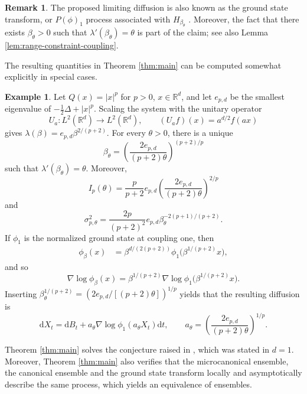 \documentclass[11pt,reqno]{amsart}
\theoremstyle{definition}
\newtheorem{remark}[theorem]{Remark}
\newtheorem{example}[theorem]{Example}
\numberwithin{equation}{section}
\newcommand{\<}{\langle}
\renewcommand{\>}{\rangle}
\def\de{{\rm d}}
\def\de{{\mathrm {d}}}
\def\bbR{{\mathbb{R}}}
\begin{document}
\begin{remark}
    The proposed limiting diffusion is  also known as the ground state transform, or $P(\phi)_1$ process associated with $H_{\beta_\theta}$ \cite{Simon79,LHB20}. Moreover, the fact that there exists $\beta_\theta >0$ such that $\lambda' (\beta_\theta) = \theta$ is part of the claim; see also Lemma \ref{lem:range-constraint-coupling}.
\end{remark}
The resulting quantities in Theorem \ref{thm:main} can be computed somewhat explicitly in special cases.
\begin{example}
    Let $Q(x)=|x|^p$ for $p>0$, $x\in\mathbb R^d$, and let $e_{p,d}$ be the smallest eigenvalue of $-\frac12\Delta+|x|^p$.
Scaling the system with the unitary operator 
\[U_a : L^2(\bbR^d)\to L^2(\bbR^d), \qquad (U_af)(x) = a^{d/2}f(ax)\]
gives $\lambda(\beta)=e_{p,d}\beta^{2/(p+2)}$.
For every $\theta>0$, there is a unique
\begin{equation}
 \beta_\theta
 =\left(\frac{2e_{p,d}}{(p+2)\theta}\right)^{(p+2)/p}
  \nonumber
\end{equation}
such that $\lambda'(\beta_\theta)=\theta$.  Moreover,
\begin{equation}
 I_p(\theta)
 =\frac{p}{p+2}e_{p,d}
  \left(\frac{2e_{p,d}}{(p+2)\theta}\right)^{2/p}
  \nonumber
\end{equation}
and
\begin{equation}
 \sigma_{p,\theta}^2
 =\frac{2p}{(p+2)^2}e_{p,d}
  \beta_\theta^{-2(p+1)/(p+2)}.
  \nonumber
\end{equation}
If $\phi_1$ is the normalized ground state at coupling one, then
\begin{align}
    \nonumber
 \phi_\beta(x)
 &=\beta^{d/(2(p+2))}
   \phi_1\bigl(\beta^{1/(p+2)}x\bigr),
\end{align}
and so
\[
 \nabla\log\phi_\beta(x)
 =\beta^{1/(p+2)}
   \nabla\log\phi_1\bigl(\beta^{1/(p+2)}x\bigr).
\]
Inserting $\beta_\theta^{1/(p+2)} = (2e_{p,d}/ [(p+2)\theta])^{1/p}$ yields that the resulting diffusion is
\[\de X_t = \de B_t + a_\theta \nabla \log \phi_1(a_\theta X_t) \de t, \qquad a_\theta = \left( \frac{2e_{p,d}}{(p+2)\theta}\right)^{1/p}.\]
\end{example}
 Theorem \ref{thm:main} solves the conjecture raised in \cite{ALS}, which was stated in $d=1$. Moreover, Theorem \ref{thm:main} also verifies that the microcanonical ensemble, the canonical ensemble and the ground state transform locally and asymptotically describe the same process, which yields an equivalence of ensembles.
 
\end{document}
